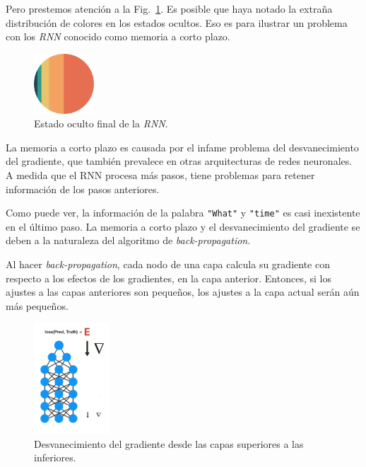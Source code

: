 \documentclass[a4paper,12pt]{article}
\begin{document}
Pero prestemos atención a la Fig.~\ref{fig:rnnvanishing3}. Es posible que haya notado la extraña distribución de colores en los estados ocultos. Eso es para ilustrar un problema con los \textit{RNN} conocido como memoria a corto plazo.

\begin{figure}[H]
	\begin{center}				
	\includegraphics[width=0.2\textwidth]{vanishin3.png}
  	\caption{Estado oculto final de la \textit{RNN}.}
  	\label{fig:rnnvanishing3}
  	\end{center}
\end{figure}

La memoria a corto plazo es causada por el infame problema del desvanecimiento del gradiente, que también prevalece en otras arquitecturas de redes neuronales. A medida que el RNN procesa más pasos, tiene problemas para retener información de los pasos anteriores. 

Como puede ver, la información de la palabra \texttt{"What"} y \texttt{"time"} es casi inexistente en el último paso. La memoria a corto plazo y el desvanecimiento del gradiente se deben a la naturaleza del algoritmo de \textit{back-propagation}.

Al hacer \textit{back-propagation}, cada nodo de una capa calcula su gradiente con respecto a los efectos de los gradientes, en la capa anterior. Entonces, si los ajustes a las capas anteriores son pequeños, los ajustes a la capa actual serán aún más pequeños. 

\begin{figure}[H]
	\begin{center}				
	\includegraphics[width=0.25\textwidth]{vanishing4.png}
  	\caption{Desvanecimiento del gradiente desde las capas superiores a las inferiores.}
  	\label{fig:rnnvanishing4}
  	\end{center}
\end{figure}
\end{document}
